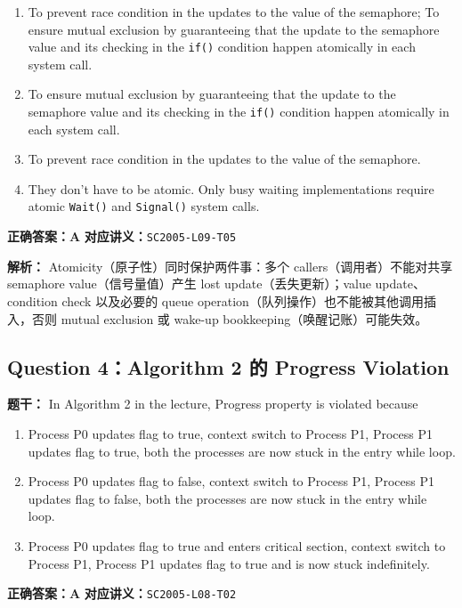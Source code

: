\documentclass[11pt,a4paper,fontset=fandol]{ctexart}
\renewcommand{\exercisequestion}[2]{%
  \Needspace{5\baselineskip}%
  \subsection{#2}\label{exercise:#1}%
}
\renewenvironment{checkedsolution}
  {\par\nopagebreak[4]\textbf{解析：}\ignorespaces}
  {\par}
\begin{document}
\begin{enumerate}[label=\Alph*.,leftmargin=2.4em]
  \item To prevent race condition in the updates to the value of the semaphore; To ensure mutual exclusion by guaranteeing that the update to the semaphore value and its checking in the \texttt{if()} condition happen atomically in each system call.
  \item To ensure mutual exclusion by guaranteeing that the update to the semaphore value and its checking in the \texttt{if()} condition happen atomically in each system call.
  \item To prevent race condition in the updates to the value of the semaphore.
  \item They don't have to be atomic. Only busy waiting implementations require atomic \texttt{Wait()} and \texttt{Signal()} system calls.
\end{enumerate}

\textbf{正确答案：A}\qquad
\textbf{对应讲义：}\texttt{SC2005-L09-T05}

\begin{checkedsolution}
Atomicity（原子性）同时保护两件事：多个 callers（调用者）不能对共享 semaphore value（信号量值）产生 lost update（丢失更新）；value update、condition check 以及必要的 queue operation（队列操作）也不能被其他调用插入，否则 mutual exclusion 或 wake-up bookkeeping（唤醒记账）可能失效。
\end{checkedsolution}

\exercisequestion{SC2005-HW03-Q04}{Question 4：Algorithm 2 的 Progress Violation}

\textbf{题干：} In Algorithm 2 in the lecture, Progress property is violated because

\begin{enumerate}[label=\Alph*.,leftmargin=2.4em]
  \item Process P0 updates flag to true, context switch to Process P1, Process P1 updates flag to true, both the processes are now stuck in the entry while loop.
  \item Process P0 updates flag to false, context switch to Process P1, Process P1 updates flag to false, both the processes are now stuck in the entry while loop.
  \item Process P0 updates flag to true and enters critical section, context switch to Process P1, Process P1 updates flag to true and is now stuck indefinitely.
\end{enumerate}

\textbf{正确答案：A}\qquad
\textbf{对应讲义：}\texttt{SC2005-L08-T02}
\end{document}
